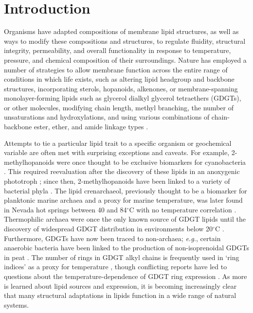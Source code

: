 \section{Introduction}
Organisms have adapted compositions of membrane lipid structures, as well as ways to modify these compositions and structures, to regulate fluidity, structural integrity, permeability, and overall functionality in response to temperature, pressure, and chemical composition of their surroundings. Nature has employed a number of strategies to allow membrane function across the entire range of conditions in which life exists, such as altering lipid headgroup and backbone structures, incorporating sterols, hopanoids, alkenones, or membrane-spanning monolayer-forming lipids such as glycerol dialkyl glycerol tetraethers (GDGTs), or other molecules, modifying chain length, methyl branching, the number of unsaturations and hydroxylations, and using various combinations of chain-backbone ester, ether, and amide linkage types \citep{marlowe1984long, belin2018hopanoid, van2008membrane}.

Attempts to tie a particular lipid trait to a specific organism or geochemical variable are often met with surprising exceptions and caveats. For example, 2-methylhopanoids were once thought to be exclusive biomarkers for cyanobacteria \citep{summons1992methylhopanoids}. This required reevaluation after the discovery of these lipids in an anoxygenic phototroph \citep{rashby2007biosynthesis}; since then, 2-methylhopanoids have been linked to a variety of bacterial phyla \citep{ricci2014diverse}. The lipid crenarchaeol, previously thought to be a biomarker for planktonic marine archaea and a proxy for marine temperature, was later found in Nevada hot springs between 40 and 84$^{\circ}$C with no temperature correlation \citep{pearson2004nonmarine}. Thermophilic archaea were once the only known source of GDGT lipids until the discovery of widespread GDGT distribution in environments below 20$^{\circ}$C \citep{schouten2000widespread}. Furthermore, GDGTs have now been traced to non-archaea; \textit{e.g.}, certain anaerobic bacteria have been linked to the production of non-isoprenoidal GDGTs in peat \citep{weijers2006membrane}. The number of rings in GDGT alkyl chains is frequently used in `ring indices' as a proxy for temperature \citep{schouten2002distributional, tierney2012gdgt}, though conflicting reports have led to questions about the temperature-dependence of GDGT ring expression \citep{sollich2017heat}. As more is learned about lipid sources and expression, it is becoming increasingly clear that many structural adaptations in lipids function in a wide range of natural systems.

